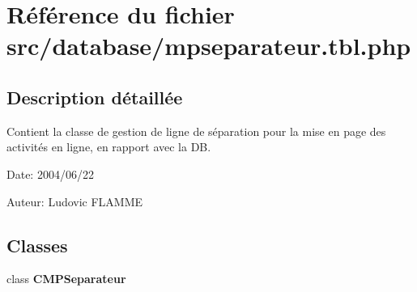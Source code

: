 \section{Référence du fichier src/database/mpseparateur.tbl.php}
\label{mpseparateur_8tbl_8php}


\subsection{Description détaillée}
Contient la classe de gestion de ligne de séparation pour la mise en page des activités en ligne, en rapport avec la DB. 

\begin{Desc}
\item[Date:]2004/06/22\end{Desc}
\begin{Desc}
\item[Auteur:]Ludovic FLAMME \end{Desc}


\subsection*{Classes}
\begin{CompactItemize}
\item 
class \textbf{CMPSeparateur}
\end{CompactItemize}
